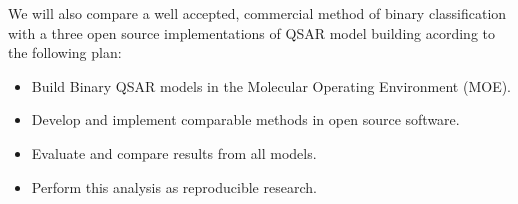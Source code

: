 We will also compare a well accepted, commercial method of binary classification with a three open source implementations of QSAR model building acording to the following plan:

\begin{itemize}

\item Build Binary QSAR models in the Molecular Operating Environment (MOE).

\item Develop and implement comparable methods in open source software.

\item Evaluate and compare results from all models.

\item Perform this analysis as reproducible research.

\end{itemize}


